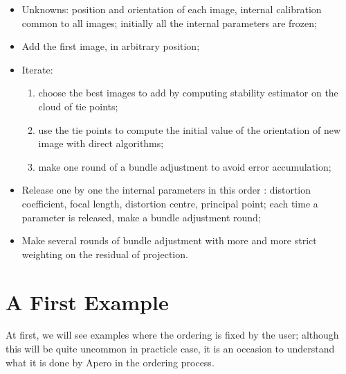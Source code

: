\begin{itemize}

    \item Unknowns: position and orientation of each image, internal calibration common to all images; 
            initially all the internal parameters are frozen; 

     \item        Add the first image, in arbitrary position;

      \item        Iterate: %
\begin{enumerate}
	\item choose the best images to add  by computing stability estimator on the cloud of tie points;
	\item use the tie points to compute the initial value of the orientation of new image with direct algorithms;
	\item make one round of a bundle adjustment to avoid error accumulation;
\end{enumerate}

       \item      Release one by one the internal parameters in this order : distortion coefficient, focal length, 
            distortion centre, principal point; each time a parameter is released, make a bundle adjustment round;


        \item      Make several rounds of bundle adjustment with more and more strict weighting on the residual of projection.
\end{itemize}



\section{A First Example}

At first, we will see examples where the ordering is
fixed by the user; although this will be quite uncommon in practicle
case, it is an occasion to understand what it is done by Apero in
the ordering process.

